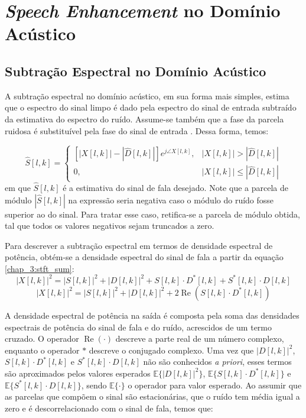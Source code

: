 \section{\textit{Speech Enhancement} no Domínio Acústico}
\subsection{Subtração Espectral no Domínio Acústico}

A subtração espectral no domínio acústico, em sua forma mais simples, estima que
o espectro do sinal limpo é dado pela espectro do sinal de entrada subtraído da
estimativa do espectro do ruído. Assume-se também que a fase da parcela ruidosa
é substituível pela fase do sinal de entrada \cite{loizou}. Dessa forma,
temos:

\begin{equation} \label{chap_4:sub_magn}
    \hat{S}[l, k] =
    \begin{cases}
     [|X[l, k]| - |\hat{D}[l, k]|]e^{j\angle{X[l, k]}}, & |X[l, k]| > |\hat{D}[l, k]| \\
     0, & |X[l, k]| \leq |\hat{D}[l, k]|
    \end{cases}
\end{equation}
em que $\hat{S}[l, k]$ é a estimativa do sinal de fala desejado. Note que a
parcela de módulo $|\hat{S}[l, k]|$ na expressão seria negativa caso o módulo do
ruído fosse superior ao do sinal. Para tratar esse caso, retifica-se a parcela de
módulo obtida, tal que todos os valores negativos sejam truncados a zero.

Para descrever a subtração espectral em termos de densidade espectral de
potência, obtém-se a densidade espectral do sinal de fala a partir da equação
\eqref{chap_3:stft_sum}:
\begin{equation}
    |X[l, k]|^2 = |S[l, k]|^2 + |D[l, k]|^2 + S[l, k]\cdot D^*[l,k] + S^*[l,k] \cdot D[l,k]  
\end{equation}
\begin{equation}
    |X[l, k]|^2 = |S[l, k]|^2 + |D[l, k]|^2 + 2\operatorname{Re}(S[l, k]\cdot D^*[l,k])  
\end{equation}

A densidade espectral de potência na saída é composta pela soma das densidades
espectrais de potência do sinal de fala e do ruído, acrescidos de um termo
cruzado. O operador $\operatorname{Re}(\cdot)$ descreve a parte real de um
número complexo, enquanto o operador $*$ descreve o conjugado complexo. Uma vez
que $|D[l, k]|^2$, $S[l, k]\cdot D^*[l,k]$ e $ S^*[l,k] \cdot D[l,k]$ não são
conhecidos \textit{a priori}, esses termos são aproximados pelos valores
esperados $\mathbb{E}\{|D[l,k]|^2\}$,  $\mathbb{E}\{S[l, k]\cdot D^*[l,k]\}$ e
$\mathbb{E}\{S^*[l,k] \cdot D[l,k]\}$, sendo $\mathbb{E}\{\cdot \}$ o operador
para valor esperado. Ao assumir que as parcelas que compõem o sinal são
estacionárias, que o ruído tem média igual a zero e é descorrelacionado com o sinal
de fala, temos que:

